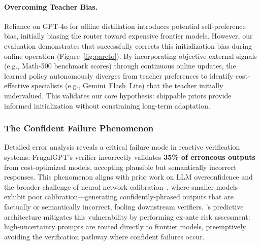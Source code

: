 \paragraph{Overcoming Teacher Bias.} Reliance on GPT-4o for offline distillation introduces potential self-preference bias, initially biasing the router toward expensive frontier models. However, our evaluation demonstrates that \ours{} successfully corrects this initialization bias during online operation (Figure~\ref{fig:pareto}). By incorporating objective external signals (e.g., Math-500 benchmark scores) through continuous online updates, the learned policy autonomously diverges from teacher preferences to identify cost-effective specialists (e.g., Gemini~Flash~Lite) that the teacher initially undervalued. This validates our core hypothesis: shippable priors provide informed initialization without constraining long-term adaptation.

\subsubsection{The Confident Failure Phenomenon}
\label{sec:confident_failure}

\begin{sloppypar}
Detailed error analysis reveals a critical failure mode in reactive verification systems: FrugalGPT's verifier incorrectly validates \textbf{35\% of erroneous outputs} from cost-optimized models, accepting plausible but semantically incorrect responses. This phenomenon aligns with prior work on LLM overconfidence and the broader challenge of neural network calibration~\cite{guo2017calibration,kadavath2022language,lin2022teaching,wang2024survey}, where smaller models exhibit poor calibration---generating confidently-phrased outputs that are factually or semantically incorrect, fooling downstream verifiers. \ours{}'s predictive architecture mitigates this vulnerability by performing ex-ante risk assessment: high-uncertainty prompts are routed directly to frontier models, preemptively avoiding the verification pathway where confident failures occur.
\end{sloppypar}

\begin{table}[t]
\centering
\small
\caption{\textbf{Domain Breakdown.} Hybrid beats FrugalGPT on Instruction (+3\%) via proactive prediction.}
\label{tab:domain_breakdown}
\end{table}

